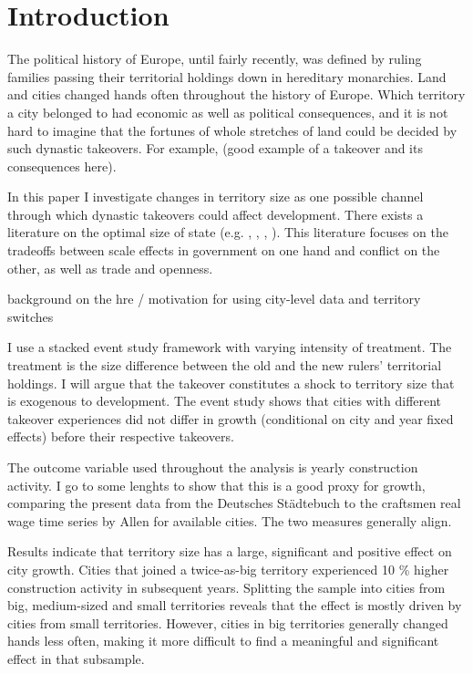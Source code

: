 \documentclass{article}
\begin{document}
\newpage

\setcounter{page}{1}

\doublespacing

 
\section{Introduction}



The political history of Europe, until fairly recently, was defined by ruling families passing their territorial holdings down in hereditary monarchies. Land and cities changed hands often throughout the history of Europe. Which territory a city belonged to had economic as well as political consequences, and it is not hard to imagine that the fortunes of whole stretches of land could be decided by such dynastic takeovers. For example, (good example of a takeover and its consequences here).

In this paper I investigate changes in territory size as one possible channel through which dynastic takeovers could affect development. There exists a literature on the optimal size of state (e.g. \cite{as1997}, \cite{aw1998}, \cite{asw2000}, \cite{easterly2000}). This literature focuses on the tradeoffs between scale effects in government on one hand and conflict on the other, as well as trade and openness.

background on the hre / motivation for using city-level data and territory switches

I use a stacked event study framework with varying intensity of treatment. The treatment is the size difference between the old and the new rulers' territorial holdings. I will argue that the takeover constitutes a shock to territory size that is exogenous to development. The event study shows that cities with different takeover experiences did not differ in growth (conditional on city and year fixed effects) before their respective takeovers. 

The outcome variable used throughout the analysis is yearly construction activity. I go to some lenghts to show that this is a good proxy for growth, comparing the present data from the Deutsches St\"adtebuch to the craftsmen real wage time series by Allen for available cities. The two measures generally align.

Results indicate that territory size has a large, significant and positive effect on city growth. Cities that joined a twice-as-big territory experienced 10 \% higher construction activity in subsequent years. Splitting the sample into cities from big, medium-sized and small territories reveals that the effect is mostly driven by cities from small territories. However, cities in big territories generally changed hands less often, making it more difficult to find a meaningful and significant effect in that subsample.
\end{document}
